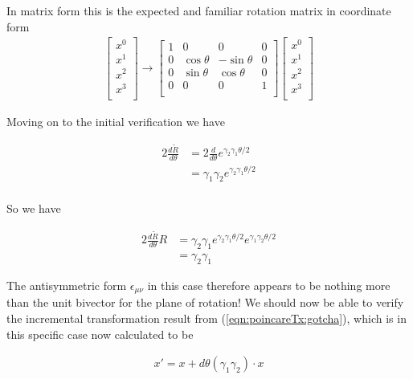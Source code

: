 In matrix form this is the expected and familiar rotation matrix in coordinate form
\begin{align*}
\begin{bmatrix}
x^0 \\
x^1 \\
x^2 \\
x^3 \\
\end{bmatrix}
\rightarrow
\begin{bmatrix}
1 & 0 & 0 & 0 \\
0 & \cos\theta & -\sin\theta & 0 \\
0 & \sin\theta & \cos\theta & 0 \\
0 & 0 & 0 & 1 \\
\end{bmatrix}
\begin{bmatrix}
x^0 \\
x^1 \\
x^2 \\
x^3 \\
\end{bmatrix}
\end{align*}

Moving on to the initial verification we have

\begin{align*}
2 \frac{d\tilde{R}}{d\theta} 
&= 2\frac{d}{d\theta} e^{\gamma_2\gamma_1 \theta/2} \\
&= \gamma_1 \gamma_2 e^{\gamma_2\gamma_1 \theta/2} \\
\end{align*}

So we have

\begin{align*}
2 \frac{d\tilde{R}}{d\theta} R 
&= \gamma_2 \gamma_1 e^{\gamma_2\gamma_1 \theta/2} e^{\gamma_1\gamma_2 \theta/2} \\
&= \gamma_2 \gamma_1 
\end{align*}

The antisymmetric form $\epsilon_{\mu\nu}$ in this case therefore appears to be nothing more than the unit bivector for the plane of rotation!  We should now be able to verify the incremental transformation result from (\ref{eqn:poincareTx:gotcha}), which is in this specific case now calculated to be

\begin{align}\label{eqn:poincareTx:xyRot}
x'= x + d\theta (\gamma_1 \gamma_2) \cdot x
\end{align}

